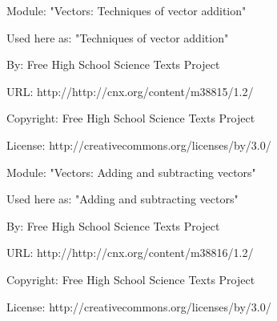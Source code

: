       \par\vspace{9pt}\noindent\begin{minipage}{\textwidth}
      Module: "Vectors: Techniques of vector addition" \par\nopagebreak\noindent
      Used here as: "Techniques of vector addition" \par\nopagebreak\noindent
        By: Free High School Science Texts Project\par\nopagebreak\noindent
      URL: http://http://cnx.org/content/m38815/1.2/\par\nopagebreak\noindent
      \par\nopagebreak\noindent
      Copyright: Free High School Science Texts Project\par\nopagebreak\noindent
      License:  http://creativecommons.org/licenses/by/3.0/\par\nopagebreak\noindent
      \par\end{minipage}
      \par\vspace{9pt}\noindent\begin{minipage}{\textwidth}
      Module: "Vectors: Adding and subtracting vectors" \par\nopagebreak\noindent
      Used here as: "Adding and subtracting vectors" \par\nopagebreak\noindent
        By: Free High School Science Texts Project\par\nopagebreak\noindent
      URL: http://http://cnx.org/content/m38816/1.2/\par\nopagebreak\noindent
      \par\nopagebreak\noindent
      Copyright: Free High School Science Texts Project\par\nopagebreak\noindent
      License:  http://creativecommons.org/licenses/by/3.0/\par\nopagebreak\noindent
      \par\end{minipage}
